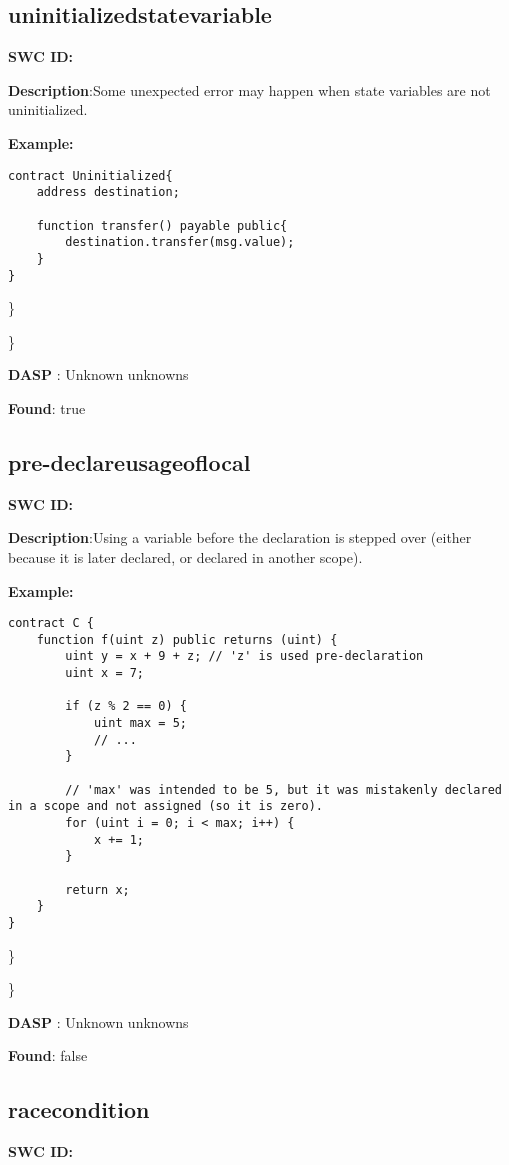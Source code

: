 \documentclass{article}
\begin{document}
\subsection{uninitialized\textunderscore state\textunderscore variable} 
\textbf{SWC \textunderscore ID:} 

\textbf{Description}:Some unexpected error may happen when state variables are not uninitialized.


\textbf{Example:} 
\begin{verbatim}
contract Uninitialized{
    address destination;

    function transfer() payable public{
        destination.transfer(msg.value);
    }
}

\end{verbatim}\} 

\} 

\textbf{DASP} : Unknown unknowns

\textbf{Found}: true

\subsection{pre-declare\textunderscore usage\textunderscore of\textunderscore local} 
\textbf{SWC \textunderscore ID:} 

\textbf{Description}:Using a variable before the declaration is stepped over (either because it is later declared, or declared in another scope).


\textbf{Example:} 
\begin{verbatim}
contract C {
    function f(uint z) public returns (uint) {
        uint y = x + 9 + z; // 'z' is used pre-declaration
        uint x = 7;

        if (z % 2 == 0) {
            uint max = 5;
            // ...
        }

        // 'max' was intended to be 5, but it was mistakenly declared in a scope and not assigned (so it is zero).
        for (uint i = 0; i < max; i++) {
            x += 1;
        }

        return x;
    }
}

\end{verbatim}\} 

\} 

\textbf{DASP} : Unknown unknowns

\textbf{Found}: false

\subsection{race\textunderscore condition} 
\textbf{SWC \textunderscore ID:} 
\end{document}

